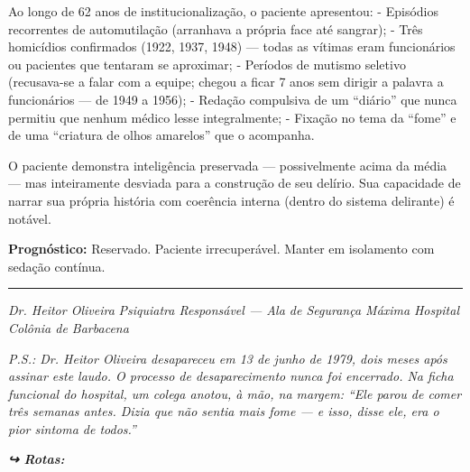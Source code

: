 \noindent Ao longo de 62 anos de institucionalização, o paciente apresentou:
- Episódios recorrentes de automutilação (arranhava a própria face até sangrar);
- Três homicídios confirmados (1922, 1937, 1948) --- todas as vítimas eram funcionários ou pacientes que tentaram se aproximar;
- Períodos de mutismo seletivo (recusava-se a falar com a equipe; chegou a ficar 7 anos sem dirigir a palavra a funcionários --- de 1949 a 1956);
- Redação compulsiva de um \textquotedblleft{}diário\textquotedblright{} que nunca permitiu que nenhum médico lesse integralmente;
- Fixação no tema da \textquotedblleft{}fome\textquotedblright{} e de uma \textquotedblleft{}criatura de olhos amarelos\textquotedblright{} que o acompanha.

\noindent O paciente demonstra inteligência preservada --- possivelmente acima da média --- mas inteiramente desviada para a construção de seu delírio. Sua capacidade de narrar sua própria história com coerência interna (dentro do sistema delirante) é notável.

\noindent \textbf{Prognóstico:} Reservado. Paciente irrecuperável. Manter em isolamento com sedação contínua.

\vspace{0.5em}\noindent\rule{\textwidth}{0.5pt}\vspace{0.5em}

\noindent \textit{Dr. Heitor Oliveira}
\textit{Psiquiatra Responsável --- Ala de Segurança Máxima}
\textit{Hospital Colônia de Barbacena}

\noindent \textit{P.S.: Dr. Heitor Oliveira desapareceu em 13 de junho de 1979, dois meses após assinar este laudo. O processo de desaparecimento nunca foi encerrado. Na ficha funcional do hospital, um colega anotou, à mão, na margem: \textquotedblleft{}Ele parou de comer três semanas antes. Dizia que não sentia mais fome --- e isso, disse ele, era o pior sintoma de todos.\textquotedblright{}}

\vspace{0.5em}
\noindent\textit{\textbf{↪ Rotas:}  \rotasep {}}